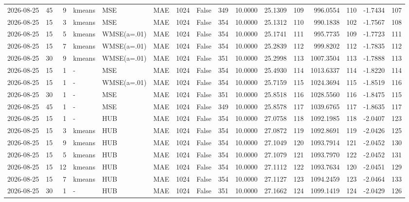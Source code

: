 \documentclass[10pt]{article}
\begin{document}
\begin{landscape}
\begin{longtable}{@{}lrrlllrcrrrrrrrr@{}}
2026-08-25 & 45 & 9 & kmeans & MSE & MAE & 1024 & False & 349 & 10.0000 & 25.1309 & 109 & 996.0554 & 110 & -1.7434 & 107 \\
2026-08-25 & 15 & 3 & kmeans & MSE & MAE & 1024 & False & 354 & 10.0000 & 25.1312 & 110 & 990.1838 & 102 & -1.7567 & 108 \\
2026-08-25 & 15 & 5 & kmeans & WMSE(a=.01) & MAE & 1024 & False & 354 & 10.0000 & 25.1741 & 111 & 995.7735 & 109 & -1.7723 & 111 \\
2026-08-25 & 15 & 7 & kmeans & WMSE(a=.01) & MAE & 1024 & False & 354 & 10.0000 & 25.2839 & 112 & 999.8202 & 112 & -1.7835 & 112 \\
2026-08-25 & 30 & 9 & kmeans & WMSE(a=.01) & MAE & 1024 & False & 351 & 10.0000 & 25.2998 & 113 & 1007.3504 & 113 & -1.7888 & 113 \\
2026-08-25 & 15 & 1 & - & MSE & MAE & 1024 & False & 354 & 10.0000 & 25.4930 & 114 & 1013.6337 & 114 & -1.8220 & 114 \\
2026-08-25 & 15 & 1 & - & WMSE(a=.01) & MAE & 1024 & False & 354 & 10.0000 & 25.7159 & 115 & 1024.3694 & 115 & -1.8519 & 116 \\
2026-08-25 & 30 & 1 & - & MSE & MAE & 1024 & False & 351 & 10.0000 & 25.8518 & 116 & 1028.5560 & 116 & -1.8475 & 115 \\
2026-08-25 & 45 & 1 & - & MSE & MAE & 1024 & False & 349 & 10.0000 & 25.8578 & 117 & 1039.6765 & 117 & -1.8635 & 117 \\
2026-08-25 & 15 & 1 & - & HUB & MAE & 1024 & False & 354 & 10.0000 & 27.0758 & 118 & 1092.1985 & 118 & -2.0407 & 123 \\
2026-08-25 & 15 & 3 & kmeans & HUB & MAE & 1024 & False & 354 & 10.0000 & 27.0872 & 119 & 1092.8691 & 119 & -2.0426 & 125 \\
2026-08-25 & 15 & 9 & kmeans & HUB & MAE & 1024 & False & 354 & 10.0000 & 27.1049 & 120 & 1093.7914 & 121 & -2.0452 & 130 \\
2026-08-25 & 15 & 5 & kmeans & HUB & MAE & 1024 & False & 354 & 10.0000 & 27.1079 & 121 & 1093.7970 & 122 & -2.0452 & 131 \\
2026-08-25 & 15 & 12 & kmeans & HUB & MAE & 1024 & False & 354 & 10.0000 & 27.1112 & 122 & 1093.7634 & 120 & -2.0451 & 129 \\
2026-08-25 & 15 & 7 & kmeans & HUB & MAE & 1024 & False & 354 & 10.0000 & 27.1127 & 123 & 1094.2459 & 123 & -2.0464 & 133 \\
2026-08-25 & 30 & 1 & - & HUB & MAE & 1024 & False & 351 & 10.0000 & 27.1662 & 124 & 1099.1419 & 124 & -2.0429 & 126 \\

\end{longtable}
\end{landscape}
\end{document}
